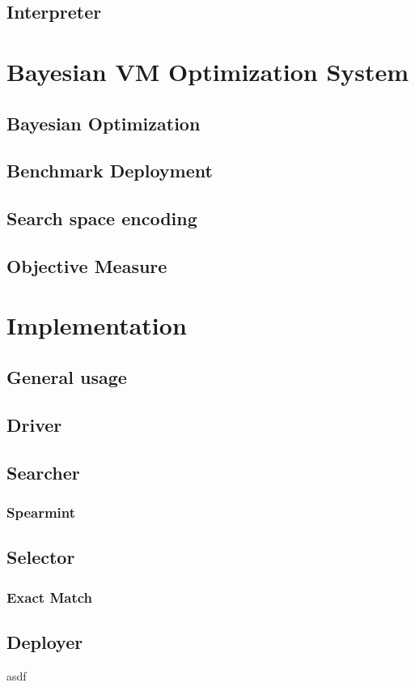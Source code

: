 \documentclass{report}
\begin{document}
\section{Interpreter}
\chapter{Bayesian VM Optimization System}
\section{Bayesian Optimization}
\section{Benchmark Deployment}
\section{Search space encoding}
\section{Objective Measure}
\chapter{Implementation}
\section{General usage}
\section{Driver}
\section{Searcher}
\subsection{Spearmint}
\section{Selector}
\subsection{Exact Match}
\section{Deployer}
asdf 
\end{document}
